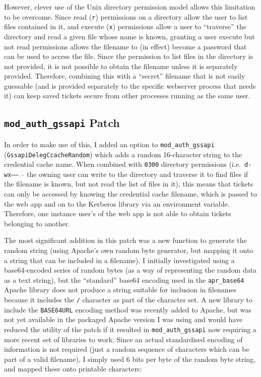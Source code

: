 \documentclass{report}
\begin{document}
However, clever use of the Unix directory permission model allows this limitation to be overcome. Since read (\texttt{r}) permissions on a directory allow the user to list files contained in it, and execute (\texttt{x}) permissions allow a user to ``traverse'' the directory and read a given file whose name is known, granting a user execute but not read permissions allows the filename to (in effect) become a password that can be used to access the file. Since the permission to list files in the directory is not provided, it is not possible to obtain the filename unless it is separately provided. Therefore, combining this with a ``secret'' filename that is not easily guessable (and is provided separately to the specific webserver process that needs it) can keep saved tickets secure from other processes running as the same user.

\subsection{\texttt{mod\_auth\_gssapi} Patch}
In order to make use of this, I added an option to \verb+mod_auth_gssapi+ (\texttt{GssapiDelegCcacheRandom}) which adds a random 16-character string to the credential cache name. When combined with \texttt{0300} directory permissions (i.e.\ \texttt{d-wx------} -- the owning user can write to the directory and traverse it to find files if the filename is known, but not read the list of files in it), this means that tickets can only be accessed by knowing the credential cache filename, which is passed to the web app and on to the Kerberos library via an environment variable. Therefore, one instance user's of the web app is not able to obtain tickets belonging to another.

The most significant addition in this patch was a new function to generate the random string (using Apache's own random byte generator, but mapping it onto a string that can be included in a filename). I initially investigated using a base64-encoded series of random bytes (as a way of representing the random data as a text string), but the ``standard'' base64 encoding used in the \verb+apr_base64+ Apache library does not produce a string suitable for inclusion in filenames because it includes the \verb+/+ character as part of the character set\cite{RFC4648}. A new library to include the \texttt{BASE64URL} encoding method was recently added to Apache\cite{Apache-base64-commit}, but was not yet available in the packaged Apache version I was using and would have reduced the utility of the patch if it resulted in \verb+mod_auth_gssapi+ now requiring a more recent set of libraries to work. Since an actual standardised encoding of information is not required (just a random sequence of characters which can be part of a valid filename), I simply used 6 bits per byte of the random byte string, and mapped these onto printable characters:
\end{document}
